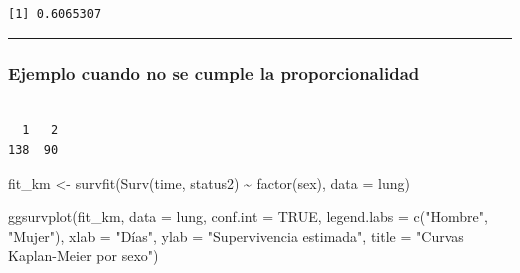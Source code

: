 \documentclass[
]{article}
\newenvironment{Shaded}{\begin{snugshade}}{\end{snugshade}}
\newcommand{\AttributeTok}[1]{\textcolor[rgb]{0.40,0.45,0.13}{#1}}
\newcommand{\CommentTok}[1]{\textcolor[rgb]{0.37,0.37,0.37}{#1}}
\newcommand{\ConstantTok}[1]{\textcolor[rgb]{0.56,0.35,0.01}{#1}}
\newcommand{\DecValTok}[1]{\textcolor[rgb]{0.68,0.00,0.00}{#1}}
\newcommand{\FunctionTok}[1]{\textcolor[rgb]{0.28,0.35,0.67}{#1}}
\newcommand{\NormalTok}[1]{\textcolor[rgb]{0.00,0.23,0.31}{#1}}
\newcommand{\OtherTok}[1]{\textcolor[rgb]{0.00,0.23,0.31}{#1}}
\newcommand{\SpecialCharTok}[1]{\textcolor[rgb]{0.37,0.37,0.37}{#1}}
\newcommand{\StringTok}[1]{\textcolor[rgb]{0.13,0.47,0.30}{#1}}
\begin{document}
\begin{verbatim}
[1] 0.6065307
\end{verbatim}

\begin{center}\rule{0.5\linewidth}{0.5pt}\end{center}

\subsubsection{Ejemplo cuando no se cumple la
proporcionalidad}\label{ejemplo-cuando-no-se-cumple-la-proporcionalidad}

\begin{Shaded}
\end{Shaded}

\begin{verbatim}

  1   2 
138  90 
\end{verbatim}

\begin{Shaded}
\begin{Highlighting}[]
\NormalTok{fit\_km }\OtherTok{\textless{}{-}} \FunctionTok{survfit}\NormalTok{(}\FunctionTok{Surv}\NormalTok{(time, status2) }\SpecialCharTok{\textasciitilde{}} \FunctionTok{factor}\NormalTok{(sex), }\AttributeTok{data =}\NormalTok{ lung)}

\FunctionTok{ggsurvplot}\NormalTok{(fit\_km,}
           \AttributeTok{data =}\NormalTok{ lung,}
           \AttributeTok{conf.int =} \ConstantTok{TRUE}\NormalTok{,}
           \AttributeTok{legend.labs =} \FunctionTok{c}\NormalTok{(}\StringTok{"Hombre"}\NormalTok{, }\StringTok{"Mujer"}\NormalTok{),}
           \AttributeTok{xlab =} \StringTok{"Días"}\NormalTok{, }\AttributeTok{ylab =} \StringTok{"Supervivencia estimada"}\NormalTok{,}
           \AttributeTok{title =} \StringTok{"Curvas Kaplan{-}Meier por sexo"}\NormalTok{)}
\end{Highlighting}
\end{Shaded}
\end{document}
